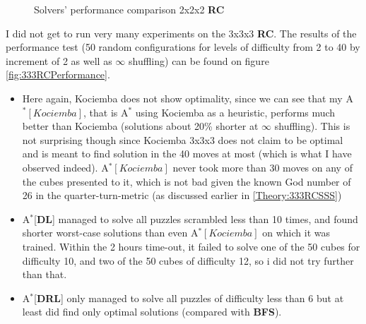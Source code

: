 \begin{figure}[H]
  \noindent
  \caption[222RCPerformance]{Solvers' performance comparison 2x2x2 \textbf{RC}}
  \label{fig:222RCPerformance}
\end{figure}



\label{sec:ResRubiks333}

I did not get to run very many experiments on the 3x3x3 \textbf{RC}. The results of the performance test (50 random configurations for levels of difficulty from 2 to 40 by increment of 2 as well as $\infty$ shuffling) can be found on figure \ref{fig:333RCPerformance}.
\begin{itemize}
\item Here again, Kociemba does not show optimality, since we can see that my A$^{*}[Kociemba]$, that is A$^{*}$ using Kociemba as a heuristic, performs much better than Kociemba (solutions about 20\% shorter at $\infty$ shuffling). This is not surprising though since Kociemba 3x3x3 does not claim to be optimal and is meant to find solution in the 40 moves at most (which is what I have observed indeed). A$^{*}[Kociemba]$ never took more than 30 moves on any of the cubes presented to it, which is not bad given the known God number of 26 in the quarter-turn-metric (as discussed earlier in \ref{Theory:333RCSSS})
\item A$^{*}$[\textbf{DL}] managed to solve all puzzles scrambled less than 10 times, and found shorter worst-case solutions than even A$^{*}[Kociemba]$ on which it was trained. Within the 2 hours time-out, it failed to solve one of the 50 cubes for difficulty 10, and two of the 50 cubes of difficulty 12, so i did not try further than that.
\item A$^{*}$[\textbf{DRL}] only managed to solve all puzzles of difficulty less than 6 but at least did find only optimal solutions (compared with \textbf{BFS}).
\end{itemize}


